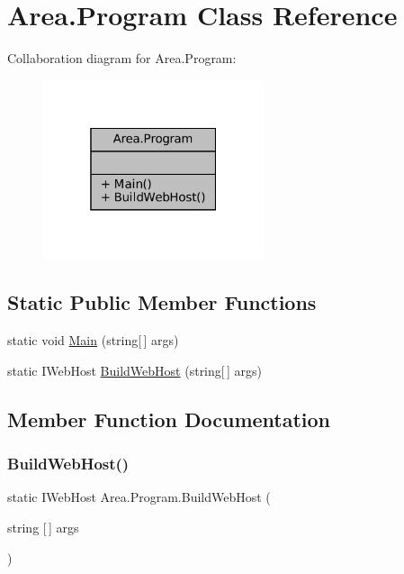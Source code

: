 \hypertarget{classArea_1_1Program}{}\section{Area.\+Program Class Reference}
\label{classArea_1_1Program}


Collaboration diagram for Area.\+Program\+:
\nopagebreak
\begin{figure}[H]
\begin{center}
\leavevmode
\includegraphics[width=184pt]{classArea_1_1Program__coll__graph}
\end{center}
\end{figure}
\subsection*{Static Public Member Functions}
\begin{DoxyCompactItemize}
\item 
static void \mbox{\hyperlink{classArea_1_1Program_a3d170d98ebe8cc51ab2fcb4b23684264}{Main}} (string\mbox{[}$\,$\mbox{]} args)
\item 
static I\+Web\+Host \mbox{\hyperlink{classArea_1_1Program_a0a25fed84b06a0c02fa7c6dd334ebd0f}{Build\+Web\+Host}} (string\mbox{[}$\,$\mbox{]} args)
\end{DoxyCompactItemize}


\subsection{Member Function Documentation}
\mbox{\label{classArea_1_1Program_a0a25fed84b06a0c02fa7c6dd334ebd0f}} 
\subsubsection{\texorpdfstring{Build\+Web\+Host()}{BuildWebHost()}}
{\footnotesize\ttfamily static I\+Web\+Host Area.\+Program.\+Build\+Web\+Host (\begin{DoxyParamCaption}\item[{string \mbox{[}$\,$\mbox{]}}]{args }\end{DoxyParamCaption})\hspace{0.3cm}{\ttfamily [static]}}

